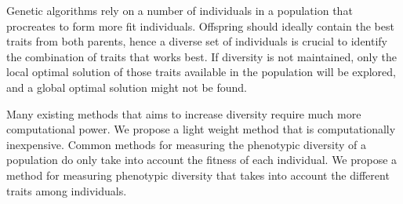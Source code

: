 Genetic algorithms rely on a number of individuals in a population that procreates to form more fit individuals. Offspring should ideally contain the best traits from both parents, hence a diverse set of individuals is crucial to identify the combination of traits that works best. If diversity is not maintained, only the local optimal solution of those traits available in the population will be explored, and a global optimal solution might not be found.
\cite{ursem2002diversity}

Many existing methods that aims to increase diversity require much more computational power.
We propose a light weight method that is computationally inexpensive.
Common methods for measuring the phenotypic diversity of a population do only take into account the fitness of each individual.
We propose a method for measuring phenotypic diversity that takes into account the different traits among individuals.